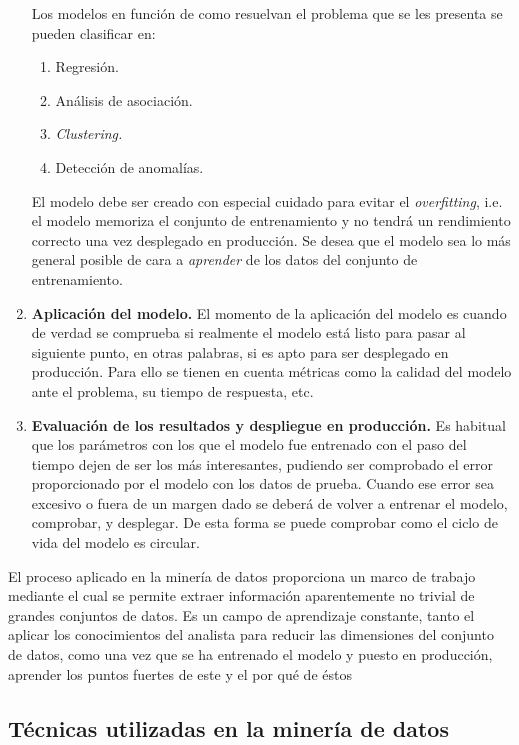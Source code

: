 \begin{enumerate}
    Los modelos en función de como resuelvan el problema que se les presenta se pueden clasificar en:
    \begin{enumerate}
        \item Regresión.
        \item Análisis de asociación.
        \item \textit{Clustering.}
        \item Detección de anomalías.
    \end{enumerate}
    
    El modelo debe ser creado con especial cuidado para evitar el \textit{overfitting}, i.e. el modelo memoriza el conjunto de entrenamiento y no tendrá un rendimiento correcto una vez desplegado en producción. Se desea que el modelo sea lo más general posible de cara a \textit{aprender} de los datos del conjunto de entrenamiento.

    \item \textbf{Aplicación del modelo.}
	El momento de la aplicación del modelo es cuando de verdad se comprueba si realmente el modelo está listo para pasar al siguiente punto, en otras palabras, si es apto para ser desplegado en producción. 
	Para ello se tienen en cuenta métricas como la calidad del modelo ante el problema, su tiempo de respuesta, etc.
    
	\item \textbf{Evaluación de los resultados y despliegue en producción.}
	Es habitual que los parámetros con los que el modelo fue entrenado con el paso del tiempo dejen de ser los más interesantes, pudiendo ser comprobado el error proporcionado por el modelo con los datos de prueba. Cuando ese error sea excesivo o fuera de un margen dado se deberá de volver a entrenar el modelo, comprobar, y desplegar. 
	De esta forma se puede comprobar como el ciclo de vida del modelo es circular.
\end{enumerate}

El proceso aplicado en la minería de datos proporciona un marco de trabajo mediante el cual se permite extraer información aparentemente no trivial de grandes conjuntos de datos. 
Es un campo de aprendizaje constante, tanto el aplicar los conocimientos del analista para reducir las dimensiones del conjunto de datos, como una vez que se ha entrenado el modelo y puesto en producción, aprender los puntos fuertes de este y el por qué de éstos~\cite{Chapman2000CRISPDM1S}

\subsection{Técnicas utilizadas en la minería de datos}

